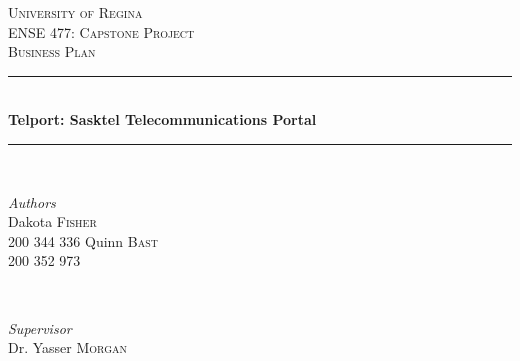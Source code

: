 \documentclass[12pt]{article}
\begin{document}

\begin{titlepage} %
	\newcommand{\HRule}{\rule{\linewidth}{0.5mm}} %
	
	\center %
	
	
	\textsc{\LARGE University of Regina}\\[1.5cm] %
	
	\textsc{\Large ENSE 477: Capstone Project}\\[0.5cm] %
	
	\textsc{\large Business Plan}\\[0.5cm] %
	
	
	\HRule\\[0.4cm]
	
	{\huge\bfseries Telport: Sasktel Telecommunications Portal}\\[0.4cm] %
	
	\HRule\\[1.5cm]
	
	
	\begin{minipage}[t]{0.4\textwidth}
		\begin{flushleft}
			\large
			\textit{Authors}\\
			Dakota \textsc{Fisher}\\ %
			200 344 336\newline \newline
			Quinn \textsc{Bast}\\ %
			200 352 973
		\end{flushleft}
	\end{minipage}
	~
	\begin{minipage}[t]{0.4\textwidth}
		\begin{flushright}
			\large
			\textit{Supervisor}\\
			Dr. Yasser \textsc{Morgan} %
		\end{flushright}
	\end{minipage}
	

\end{titlepage}
\end{document}
